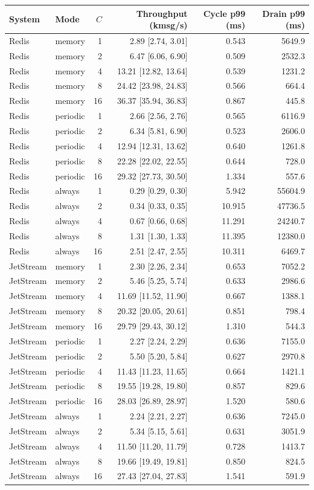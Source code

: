 \begin{longtable}{llrrrr}
\toprule
System & Mode & $C$ & Throughput (kmsg/s) & Cycle p99 (ms) & Drain p99 (ms)\\
\midrule\endhead
Redis & memory & 1 & 2.89 [2.74, 3.01] & 0.543 & 5649.9\\
Redis & memory & 2 & 6.47 [6.06, 6.90] & 0.509 & 2532.3\\
Redis & memory & 4 & 13.21 [12.82, 13.64] & 0.539 & 1231.2\\
Redis & memory & 8 & 24.42 [23.98, 24.83] & 0.566 & 664.4\\
Redis & memory & 16 & 36.37 [35.94, 36.83] & 0.867 & 445.8\\
Redis & periodic & 1 & 2.66 [2.56, 2.76] & 0.565 & 6116.9\\
Redis & periodic & 2 & 6.34 [5.81, 6.90] & 0.523 & 2606.0\\
Redis & periodic & 4 & 12.94 [12.31, 13.62] & 0.640 & 1261.8\\
Redis & periodic & 8 & 22.28 [22.02, 22.55] & 0.644 & 728.0\\
Redis & periodic & 16 & 29.32 [27.73, 30.50] & 1.334 & 557.6\\
Redis & always & 1 & 0.29 [0.29, 0.30] & 5.942 & 55604.9\\
Redis & always & 2 & 0.34 [0.33, 0.35] & 10.915 & 47736.5\\
Redis & always & 4 & 0.67 [0.66, 0.68] & 11.291 & 24240.7\\
Redis & always & 8 & 1.31 [1.30, 1.33] & 11.395 & 12380.0\\
Redis & always & 16 & 2.51 [2.47, 2.55] & 10.311 & 6469.7\\
JetStream & memory & 1 & 2.30 [2.26, 2.34] & 0.653 & 7052.2\\
JetStream & memory & 2 & 5.46 [5.25, 5.74] & 0.633 & 2986.6\\
JetStream & memory & 4 & 11.69 [11.52, 11.90] & 0.667 & 1388.1\\
JetStream & memory & 8 & 20.32 [20.05, 20.61] & 0.851 & 798.4\\
JetStream & memory & 16 & 29.79 [29.43, 30.12] & 1.310 & 544.3\\
JetStream & periodic & 1 & 2.27 [2.24, 2.29] & 0.636 & 7155.0\\
JetStream & periodic & 2 & 5.50 [5.20, 5.84] & 0.627 & 2970.8\\
JetStream & periodic & 4 & 11.43 [11.23, 11.65] & 0.664 & 1421.1\\
JetStream & periodic & 8 & 19.55 [19.28, 19.80] & 0.857 & 829.6\\
JetStream & periodic & 16 & 28.03 [26.89, 28.97] & 1.520 & 580.6\\
JetStream & always & 1 & 2.24 [2.21, 2.27] & 0.636 & 7245.0\\
JetStream & always & 2 & 5.34 [5.15, 5.61] & 0.631 & 3051.9\\
JetStream & always & 4 & 11.50 [11.20, 11.79] & 0.728 & 1413.7\\
JetStream & always & 8 & 19.66 [19.49, 19.81] & 0.850 & 824.5\\
JetStream & always & 16 & 27.43 [27.04, 27.83] & 1.541 & 591.9\\
\bottomrule
\end{longtable}
